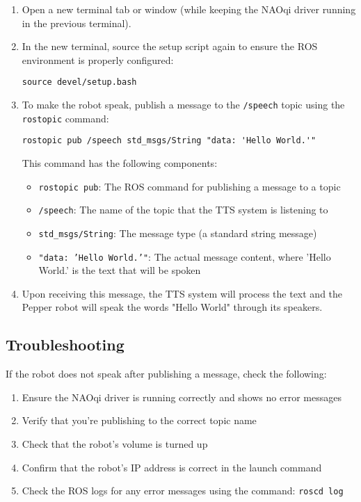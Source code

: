 \documentclass{CSSRforAfrica}
\begin{document}
\begin{enumerate}
    \item Open a new terminal tab or window (while keeping the NAOqi driver running in the previous terminal).

    \item In the new terminal, source the setup script again to ensure the ROS environment is properly configured:
    \begin{lstlisting}[style=commandstyle]
    source devel/setup.bash
    \end{lstlisting}

    \item To make the robot speak, publish a message to the \texttt{/speech} topic using the \texttt{rostopic} command:
    \begin{lstlisting}[style=commandstyle]
    rostopic pub /speech std_msgs/String "data: 'Hello World.'"
    \end{lstlisting}
    
    This command has the following components:
    \begin{itemize}
        \item \texttt{rostopic pub}: The ROS command for publishing a message to a topic
        \item \texttt{/speech}: The name of the topic that the TTS system is listening to
        \item \texttt{std\_msgs/String}: The message type (a standard string message)
        \item \texttt{"data: 'Hello World.'"}: The actual message content, where 'Hello World.' is the text that will be spoken
    \end{itemize}

    \item Upon receiving this message, the TTS system will process the text and the Pepper robot will speak the words "Hello World" through its speakers.
\end{enumerate}


\subsection{Troubleshooting}

If the robot does not speak after publishing a message, check the following:

\begin{enumerate}
    \item Ensure the NAOqi driver is running correctly and shows no error messages
    \item Verify that you're publishing to the correct topic name
    \item Check that the robot's volume is turned up
    \item Confirm that the robot's IP address is correct in the launch command
    \item Check the ROS logs for any error messages using the command: \texttt{roscd log}
\end{enumerate}
\end{document}
